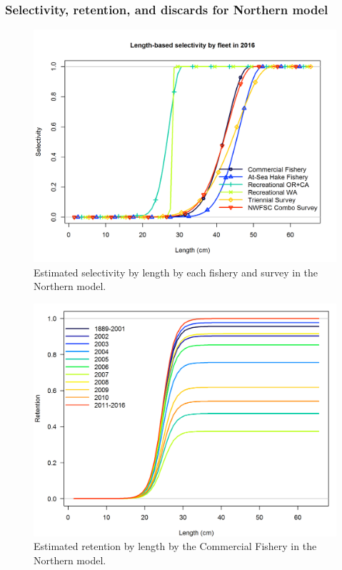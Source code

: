 \documentclass[12pt,]{article}
\begin{document}
\FloatBarrier

\newpage 

\subsubsection{Selectivity, retention, and discards for Northern
model}\label{selectivity-retention-and-discards-for-northern-model}

\begin{figure}[htbp]
\centering
\includegraphics{r4ss/plots_mod1/sel01_multiple_fleets_length1.png}
\caption{Estimated selectivity by length by each fishery and survey in
the Northern model. \label{fig:selex}}
\end{figure}

\begin{figure}[htbp]
\centering
\includegraphics{r4ss/plots_mod1/time-varying_retention.png}
\caption{Estimated retention by length by the Commercial Fishery in the
Northern model. \label{fig:retention}}
\end{figure}
\end{document}
